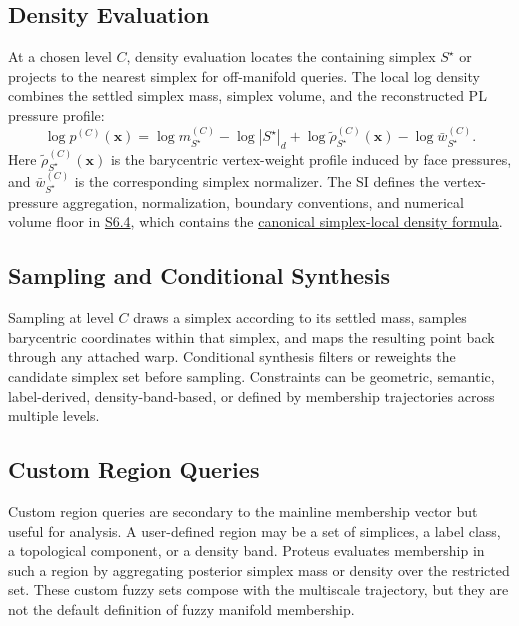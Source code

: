 \documentclass[11pt]{article}
\theoremstyle{definition}
\theoremstyle{plain}
\begin{document}
\subsection{Density Evaluation}
At a chosen level $C$, density evaluation locates the containing simplex $S^\star$ or projects to the nearest simplex for off-manifold queries. The local log density combines the settled simplex mass, simplex volume, and the reconstructed PL pressure profile:
\[
\log p^{(C)}(\mathbf x)
=\log m_{S^\star}^{(C)}
-\log |S^\star|_d
+\log \widetilde\rho_{S^\star}^{(C)}(\mathbf x)
-\log \bar w_{S^\star}^{(C)}.
\]
Here $\widetilde\rho_{S^\star}^{(C)}(\mathbf x)$ is the barycentric vertex-weight profile induced by face pressures, and $\bar w_{S^\star}^{(C)}$ is the corresponding simplex normalizer.
The SI defines the vertex-pressure aggregation, normalization, boundary conventions, and numerical volume floor in \hyperref[sec:si-simplex-density]{S6.4}, which contains the \hyperref[eq:si-simplex-local-density]{canonical simplex-local density formula}.

\subsection{Sampling and Conditional Synthesis}
Sampling at level $C$ draws a simplex according to its settled mass, samples barycentric coordinates within that simplex, and maps the resulting point back through any attached warp. Conditional synthesis filters or reweights the candidate simplex set before sampling. Constraints can be geometric, semantic, label-derived, density-band-based, or defined by membership trajectories across multiple levels.

\subsection{Custom Region Queries}
Custom region queries are secondary to the mainline membership vector but useful for analysis. A user-defined region may be a set of simplices, a label class, a topological component, or a density band. Proteus evaluates membership in such a region by aggregating posterior simplex mass or density over the restricted set. These custom fuzzy sets compose with the multiscale trajectory, but they are not the default definition of fuzzy manifold membership.
\end{document}
